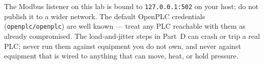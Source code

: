 \documentclass[11pt,a4paper]{article}
\begin{document}
\begin{warnbox}
The Modbus listener on this lab is bound to \texttt{127.0.0.1:502} on your host; do not publish it to a wider network. The default OpenPLC credentials (\texttt{openplc/openplc}) are well known --- treat any PLC reachable with them as already compromised. The load-and-jitter steps in Part~D can crash or trip a real PLC; never run them against equipment you do not own, and never against equipment that is wired to anything that can move, heat, or hold pressure.
\end{warnbox}
\end{document}
